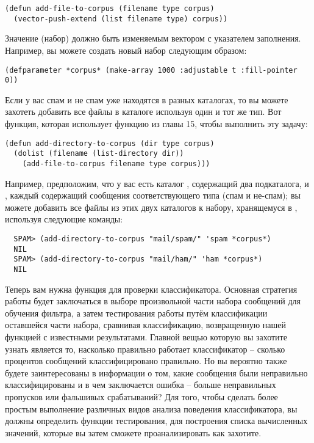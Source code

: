 \begin{lstlisting}
(defun add-file-to-corpus (filename type corpus)
  (vector-push-extend (list filename type) corpus))
\end{lstlisting}

Значение  (набор) должно быть изменяемым вектором с указателем заполнения.
Например, вы можете создать новый набор следующим образом:

\begin{lstlisting}
(defparameter *corpus* (make-array 1000 :adjustable t :fill-pointer 0))
\end{lstlisting}

Если у вас спам и не спам уже находятся в разных каталогах, то вы можете захотеть добавить
все файлы в каталоге используя один и тот же тип.  Вот функция, которая использует функцию
 из главы 15, чтобы выполнить эту задачу:

\begin{lstlisting}
(defun add-directory-to-corpus (dir type corpus)
  (dolist (filename (list-directory dir))
    (add-file-to-corpus filename type corpus)))
\end{lstlisting}

Например, предположим, что у вас есть каталог , содержащий два подкаталога,
 и , каждый содержащий сообщения соответствующего типа (спам и
не-спам); вы можете добавить все файлы из этих двух каталогов к набору, хранящемуся в
, используя следующие команды:

\begin{verbatim}
  SPAM> (add-directory-to-corpus "mail/spam/" 'spam *corpus*)
  NIL
  SPAM> (add-directory-to-corpus "mail/ham/" 'ham *corpus*)
  NIL
\end{verbatim}

Теперь вам нужна функция для проверки классификатора.  Основная стратегия работы будет
заключаться в выборе произвольной части набора сообщений для обучения фильтра, а затем
тестирования работы путём классификации оставшейся части набора, сравнивая классификацию,
возвращенную нашей функцией с известными результатами.  Главной вещью которую вы захотите
узнать является то, насколько правильно работает классификатор -- сколько процентов
сообщений классифицировано правильно.  Но вы вероятно также будете заинтересованы в
информации о том, какие сообщения были неправильно классифицированы и в чем заключается
ошибка -- больше неправильных пропусков или фальшивых срабатываний?  Для того, чтобы
сделать более простым выполнение различных видов анализа поведения классификатора, вы
должны определить функции тестирования, для построения списка вычисленных значений,
которые вы затем сможете проанализировать как захотите.

